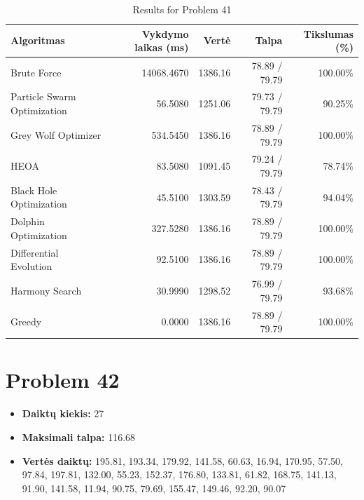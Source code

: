\documentclass[a4paper,11pt]{article}
\begin{document}
\begin{table}[h!]
\centering
\begin{tabular}{lrrrr}
\toprule
\textbf{Algoritmas} & \textbf{Vykdymo laikas (ms)} & \textbf{Vertė} & \textbf{Talpa} & \textbf{Tikslumas (\%)} \\
\midrule
Brute Force & 14068.4670 & 1386.16 & 78.89 / 79.79 & 100.00\% \\
Particle Swarm Optimization & 56.5080 & 1251.06 & 79.73 / 79.79 & 90.25\% \\
Grey Wolf Optimizer & 534.5450 & 1386.16 & 78.89 / 79.79 & 100.00\% \\
HEOA & 83.5080 & 1091.45 & 79.24 / 79.79 & 78.74\% \\
Black Hole Optimization & 45.5100 & 1303.59 & 78.43 / 79.79 & 94.04\% \\
Dolphin Optimization & 327.5280 & 1386.16 & 78.89 / 79.79 & 100.00\% \\
Differential Evolution & 92.5100 & 1386.16 & 78.89 / 79.79 & 100.00\% \\
Harmony Search & 30.9990 & 1298.52 & 76.99 / 79.79 & 93.68\% \\
Greedy & 0.0000 & 1386.16 & 78.89 / 79.79 & 100.00\% \\
\bottomrule
\end{tabular}
\caption{Results for Problem 41}
\end{table}
\clearpage

\section*{Problem 42}
\begin{itemize}
    \item \textbf{Daiktų kiekis:} 27
    \item \textbf{Maksimali talpa:} 116.68
    \item \textbf{Vertės daiktų:} 195.81, 193.34, 179.92, 141.58, 60.63, 16.94, 170.95, 57.50, 97.84, 197.81, 132.00, 55.23, 152.37, 176.80, 133.81, 61.82, 168.75, 141.13, 91.90, 141.58, 11.94, 90.75, 79.69, 155.47, 149.46, 92.20, 90.07
\end{itemize}
\end{document}
